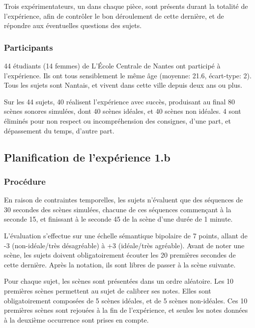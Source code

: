 \documentclass[twoside,twocolumn]{article}
\begin{document}
Trois expérimentateurs, un dans chaque pièce, sont présents durant la totalité de l'expérience, afin de contrôler le bon déroulement de cette dernière, et de répondre aux éventuelles questions des sujets. 

\subsubsection*{Participants} 
44 étudiants (14 femmes) de L’École Centrale de Nantes ont participé à l'expérience. Ils ont tous sensiblement le même âge (moyenne: 21.6, écart-type: 2). Tous les sujets sont Nantais, et vivent dans cette ville depuis deux ans ou plus.

Sur les 44 sujets, 40 réalisent l'expérience avec succès, produisant au final 80 scènes sonores simulées, dont 40 scènes idéales, et 40 scènes non idéales. 4 sont éliminés pour non respect ou incompréhension des consignes, d'une part, et dépassement du temps, d'autre part.

\subsection{Planification  de l'expérience 1.b}
\label{sec:xp1b_plan}

\subsubsection*{Procédure} 

En raison de contraintes temporelles, les sujets n'évaluent que des séquences de 30 secondes des scènes simulées, chacune de ces séquences commençant à la seconde 15, et finissant à le seconde 45 de la scène d'une durée   de 1 minute.

L'évaluation s'effectue sur une échelle sémantique bipolaire de 7 points, allant de -3 (non-idéale/très désagréable) à +3 (idéale/très agréable). Avant de noter une scène, les sujets doivent obligatoirement écouter les 20 premières secondes de cette dernière. Après la notation, ils sont libres de passer à la scène suivante.

Pour chaque sujet, les scènes sont présentées dans un ordre aléatoire. Les 10 premières scènes permettent au sujet de calibrer ses notes. Elles sont obligatoirement composées de 5 scènes idéales, et de 5 scènes non-idéales. Ces 10 premières scènes sont rejouées à la fin de l'expérience, et seules les notes données à la deuxième occurrence sont prises en compte. 
\end{document}
